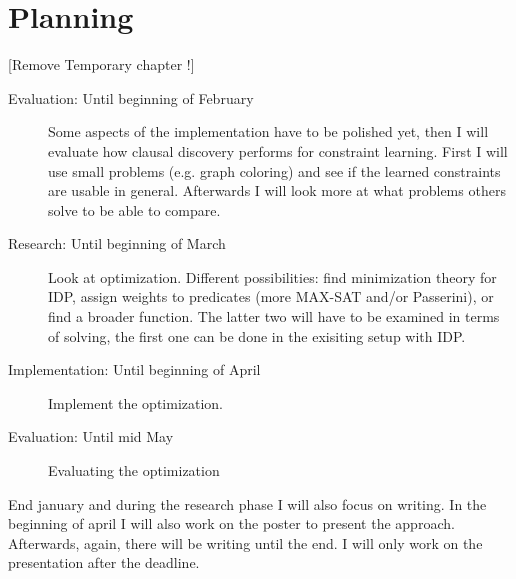 \chapter{Planning}
\label{cha:planning}
[Remove Temporary chapter !]
\begin{description}
	\item[Evaluation: Until beginning of February] Some aspects of the implementation have to be polished yet, then I will evaluate how clausal discovery performs for constraint learning. First I will use small problems (e.g. graph coloring) and see if the learned constraints are usable in general. Afterwards I will look more at what problems others solve to be able to compare.
	\item[Research: Until beginning of March] Look at optimization. Different possibilities: find minimization theory for IDP, assign weights to predicates (more MAX-SAT and/or Passerini), or find a broader function. The latter two will have to be examined in terms of solving, the first one can be done in the exisiting setup with IDP.
	\item[Implementation: Until beginning of April] Implement the optimization.
	\item[Evaluation: Until mid May] Evaluating the optimization
\end{description}

End january and during the research phase I will also focus on writing. In the beginning of april I will also work on the poster to present the approach. Afterwards, again, there will be writing until the end. I will only work on the presentation after the deadline.